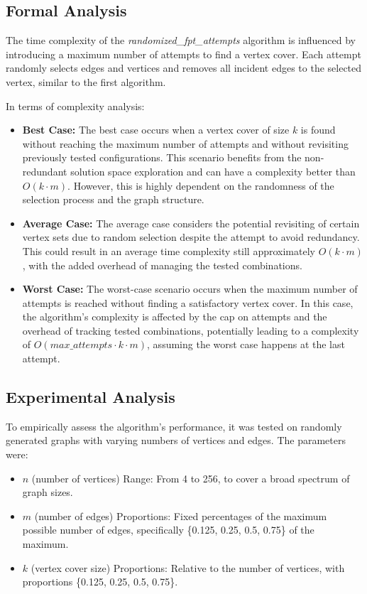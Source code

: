 \subsection{Formal Analysis}
The time complexity of the \textit{randomized\_fpt\_attempts} algorithm is influenced by introducing a maximum number of attempts to find a vertex cover. Each attempt randomly selects edges and vertices and removes all incident edges to the selected vertex, similar to the first algorithm.

In terms of complexity analysis:
\begin{itemize}
  \item \textbf{Best Case:} The best case occurs when a vertex cover of size \(k\) is found without reaching the maximum number of attempts and without revisiting previously tested configurations. This scenario benefits from the non-redundant solution space exploration and can have a complexity better than \(O(k \cdot m)\). However, this is highly dependent on the randomness of the selection process and the graph structure.
  
  \item \textbf{Average Case:} The average case considers the potential revisiting of certain vertex sets due to random selection despite the attempt to avoid redundancy. This could result in an average time complexity still approximately \(O(k \cdot m)\), with the added overhead of managing the tested combinations.

  \item \textbf{Worst Case:} The worst-case scenario occurs when the maximum number of attempts is reached without finding a satisfactory vertex cover. In this case, the algorithm's complexity is affected by the cap on attempts and the overhead of tracking tested combinations, potentially leading to a complexity of \(O(max\_attempts \cdot k \cdot m)\), assuming the worst case happens at the last attempt.
\end{itemize}

\subsection{Experimental Analysis}
To empirically assess the algorithm's performance, it was tested on randomly generated graphs with varying numbers of vertices and edges. The parameters were:

\begin{itemize}
    \item \(n\) (number of vertices) Range: From 4 to 256, to cover a broad spectrum of graph sizes.
    \item \(m\) (number of edges) Proportions: Fixed percentages of the maximum possible number of edges, specifically \{0.125, 0.25, 0.5, 0.75\} of the maximum.
    \item \(k\) (vertex cover size) Proportions: Relative to the number of vertices, with proportions \{0.125, 0.25, 0.5, 0.75\}.
\end{itemize}

